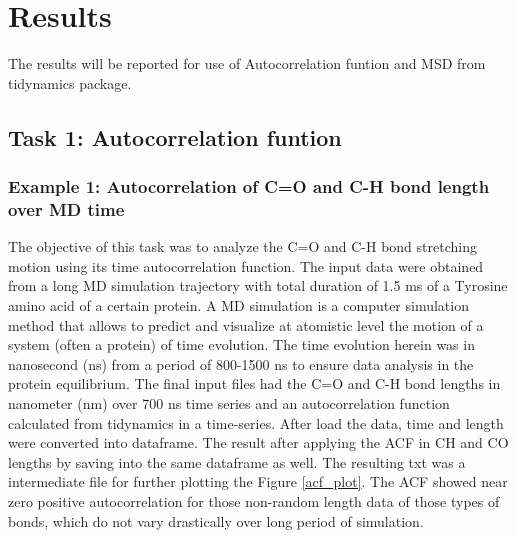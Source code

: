\documentclass{article}
\begin{document}
\section{Results}

The results will be reported for use of Autocorrelation funtion and MSD from tidynamics package\cite{Buyl2018}.

\subsection{Task 1: Autocorrelation funtion}

\subsubsection{Example 1: Autocorrelation of C=O and C-H bond length over MD time}

The objective of this task was to analyze the C=O and C-H bond stretching motion using its time autocorrelation function. The input data were obtained from a long MD simulation trajectory with total duration of 1.5 ms of a Tyrosine amino acid of a certain protein. A MD simulation is a computer simulation method that allows to predict and visualize at atomistic level the motion of a system (often a protein) of time evolution. The time evolution herein was in nanosecond (ns) from a period of 800-1500 ns to ensure data analysis in the protein equilibrium. The final input files had the C=O and C-H bond lengths in nanometer (nm) over 700 ns time series and an autocorrelation function calculated from tidynamics \cite{Buyl2018}in a time-series. After load the data, time and length were converted into dataframe. The result after applying the ACF in CH and CO lengths by saving into the same dataframe as well. The resulting txt was a intermediate file for further plotting the Figure \ref{acf_plot}. The ACF showed near zero positive autocorrelation for those non-random length data of those types of bonds, which do not vary drastically over long period of simulation.
\end{document}
